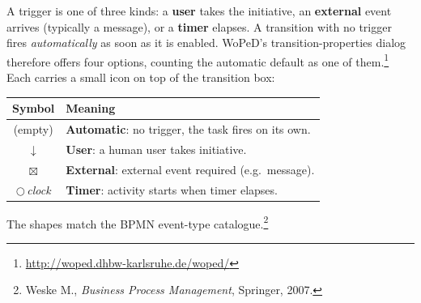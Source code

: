 A trigger is one of three kinds: a \textbf{user} takes the initiative, an \textbf{external} event arrives (typically a message), or a \textbf{timer} elapses. A transition with no trigger fires \emph{automatically} as soon as it is enabled. WoPeD's transition-properties dialog therefore offers four options, counting the automatic default as one of them.\footnote{\url{http://woped.dhbw-karlsruhe.de/woped/}} Each carries a small icon on top of the transition box:

\medskip

\begin{center}
\begin{tabular}{cl}
\toprule
\textbf{Symbol} & \textbf{Meaning} \\
\midrule
(empty)        & \textbf{Automatic}: no trigger, the task fires on its own. \\
$\downarrow$   & \textbf{User}: a human user takes initiative. \\
$\boxtimes$    & \textbf{External}: external event required (e.g.\ message). \\
$\bigcirc$\,\textit{clock} & \textbf{Timer}: activity starts when timer elapses. \\
\bottomrule
\end{tabular}
\end{center}

The shapes match the BPMN event-type catalogue.\footnote{Weske M., \emph{Business Process Management}, Springer, 2007.}


